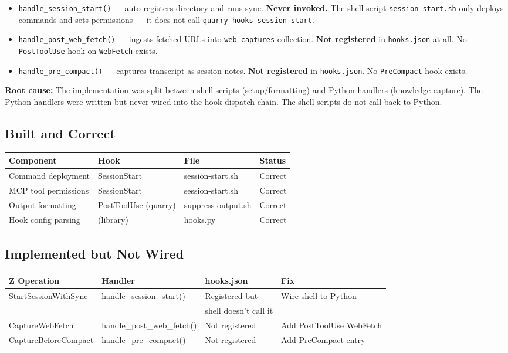 \documentclass[a4paper,10pt,fleqn]{article}
\begin{document}
\begin{itemize}
  \item \texttt{handle\_session\_start()} --- auto-registers directory
    and runs sync. \textbf{Never invoked.} The shell script
    \texttt{session-start.sh} only deploys commands and sets
    permissions --- it does not call \texttt{quarry hooks session-start}.
  \item \texttt{handle\_post\_web\_fetch()} --- ingests fetched URLs
    into \texttt{web-captures} collection. \textbf{Not registered} in
    \texttt{hooks.json} at all. No \texttt{PostToolUse} hook on
    \texttt{WebFetch} exists.
  \item \texttt{handle\_pre\_compact()} --- captures transcript as
    session notes. \textbf{Not registered} in \texttt{hooks.json}.
    No \texttt{PreCompact} hook exists.
\end{itemize}

\textbf{Root cause:} The implementation was split between shell
scripts (setup/formatting) and Python handlers (knowledge capture).
The Python handlers were written but never wired into the hook
dispatch chain. The shell scripts do not call back to Python.

\subsection{Built and Correct}

\begin{tabular}{llll}
\hline
\textbf{Component} & \textbf{Hook} & \textbf{File} & \textbf{Status} \\
\hline
Command deployment & SessionStart & session-start.sh & Correct \\
MCP tool permissions & SessionStart & session-start.sh & Correct \\
Output formatting & PostToolUse (quarry) & suppress-output.sh & Correct \\
Hook config parsing & (library) & hooks.py & Correct \\
\hline
\end{tabular}

\subsection{Implemented but Not Wired}

\begin{tabular}{llll}
\hline
\textbf{Z Operation} & \textbf{Handler} & \textbf{hooks.json} & \textbf{Fix} \\
\hline
StartSessionWithSync & handle\_session\_start() & Registered but & Wire shell to Python \\
 & & shell doesn't call it & \\
CaptureWebFetch & handle\_post\_web\_fetch() & Not registered & Add PostToolUse WebFetch \\
CaptureBeforeCompact & handle\_pre\_compact() & Not registered & Add PreCompact entry \\
\hline
\end{tabular}
\end{document}
